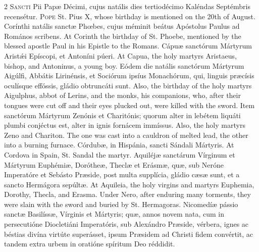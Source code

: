 \begin{paracol}{2}
\lettrine[lines=2]{S}{ancti} Pii Papæ Décimi, 
 cujus natális dies tertiodécimo Kaléndas Septémbris recensétur.
\switchcolumn
{}
\lettrine[lines=2]{P}{ope} St. Pius X, whose birthday is 
 mentioned on the 20th of August.
\switchcolumn*
{}
Corínthi natális sanctæ 
 Phœbes, cujus méminit beátus Apóstolus Paulus ad Romános scribens.
\switchcolumn
{}
At Corinth the birthday of St. 
 Phoebe, mentioned by the blessed apostle Paul in his Epistle to the Romans.
\switchcolumn*
{}
Cápuæ sanctórum 
 Mártyrum Aristǽi Epíscopi, et Antoníni púeri.
\switchcolumn
{}
At Capua, the holy martyrs Aristaeus, 
 bishop, and Antoninus, a young boy.
\switchcolumn*
{}
Eódem die natális 
 sanctórum Mártyrum Aigúlfi, Abbátis Lirinénsis, et Sociórum ipsíus 
 Monachórum, qui, linguis præcísis oculísque effóssis, gládio obtruncáti sunt.
\switchcolumn
{}
Also, the birthday of the holy 
 martyrs Aigulphus, abbot of Lerins, and the monks, his companions, who, 
 after their tongues were cut off and their eyes plucked out, were killed 
 with the sword.
\switchcolumn*
{}
Item sanctórum Mártyrum 
 Zenónis et Charitónis; quorum alter in lebétem liquáti plumbi conjéctus est, 
 alter in ignis fornácem immíssus.
\switchcolumn
{}
Also, the holy martyrs Zeno and 
 Chariton. The one was cast into a cauldron of melted lead, the other 
 into a burning furnace.
\switchcolumn*
{}
Córdubæ, in Hispánia, 
 sancti Sándali Mártyris.
\switchcolumn
{}
At Cordova in Spain, St. Sandal the 
 martyr.
\switchcolumn*
{}
Aquiléjæ sanctárum 
 Vírginum et Mártyrum Euphémiæ, Dorótheæ, Theclæ et Erásmæ, quæ, sub Neróne 
 Imperatóre et Sebásto Præside, post multa supplícia, gládio cæsæ sunt, et a 
 sancto Hermágora sepúltæ.
\switchcolumn
{}
At Aquileia, the holy virgins and 
 martyrs Euphemia, Dorothy, Thecla, and Erasma. Under Nero, after 
 enduring many torments, they were slain with the sword and buried by St. 
 Hermagoras.
\switchcolumn*
{}
Nicomedíæ pássio sanctæ 
 Basilíssæ, Vírginis et Mártyris; quæ, annos novem nata, cum in persecutióne 
 Diocletiáni Imperatóris, sub Alexándro Præside, vérbera, ignes ac béstias 
 divína virtúte superásset, ipsum Præsidem ad Christi fidem convértit, ac 
 tandem extra urbem in oratióne spíritum Deo réddidit.
\switchcolumn

\end{paracol}
